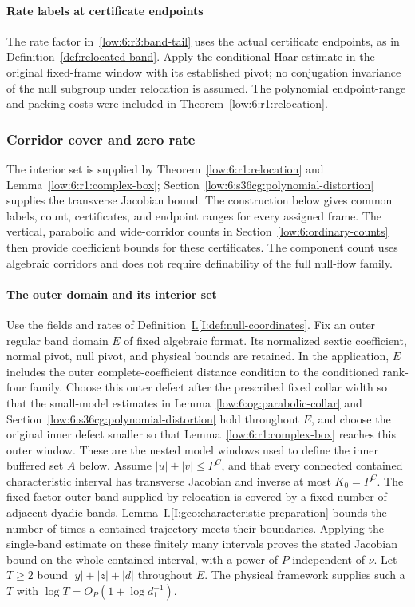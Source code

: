 \documentclass[11pt]{amsart}
\theoremstyle{definition}
\theoremstyle{remark}
\numberwithin{equation}{section}
\newcommand{\partIref}[1]{\hyperref[I:#1]{I.\ref*{I:#1}}}
\begin{document}
\paragraph{Rate labels at certificate endpoints}

The rate factor in~\eqref{low:6:r3:band-tail} uses the actual certificate endpoints, as in Definition~\ref{def:relocated-band}. Apply the conditional Haar estimate in the original fixed-frame window with its established pivot; no conjugation invariance of the null subgroup under relocation is assumed. The polynomial endpoint-range and packing costs were included in Theorem~\ref{low:6:r1:relocation}.

\subsubsection{Corridor cover and zero rate}

The interior set is supplied by Theorem~\ref{low:6:r1:relocation} and Lemma~\ref{low:6:r1:complex-box}; Section~\ref{low:6:s36cg:polynomial-distortion} supplies the transverse Jacobian bound. The construction below gives common labels, count, certificates, and endpoint ranges for every assigned frame. The vertical, parabolic and wide-corridor counts in Section~\ref{low:6:ordinary-counts} then provide coefficient bounds for these certificates. The component count uses algebraic corridors and does not require definability of the full null-flow family.

\paragraph{The outer domain and its interior set}

Use the fields and rates of Definition~\partIref{def:null-coordinates}. Fix an outer regular band domain $E$ of fixed algebraic format. Its normalized sextic coefficient, normal pivot, null pivot, and physical bounds are retained. In the application, $E$ includes the outer complete-coefficient distance condition to the conditioned rank-four family. Choose this outer defect after the prescribed fixed collar width so that the small-model estimates in Lemma~\ref{low:6:og:parabolic-collar} and Section~\ref{low:6:s36cg:polynomial-distortion} hold throughout $E$, and choose the original inner defect smaller so that Lemma~\ref{low:6:r1:complex-box} reaches this outer window. These are the nested model windows used to define the inner buffered set $A$ below. Assume $|u|+|v|\le P^C$, and that every connected contained characteristic interval has transverse Jacobian and inverse at most $K_0=P^C$. The fixed-factor outer band supplied by relocation is covered by a fixed number of adjacent dyadic bands. Lemma~\partIref{geo:characteristic-preparation} bounds the number of times a contained trajectory meets their boundaries. Applying the single-band estimate on these finitely many intervals proves the stated Jacobian bound on the whole contained interval, with a power of $P$ independent of $\nu$. Let $T\ge2$ bound $|y|+|z|+|d|$ throughout $E$. The physical framework supplies such a $T$ with $\log T=O_P(1+\log d_1^{-1})$.
\end{document}
